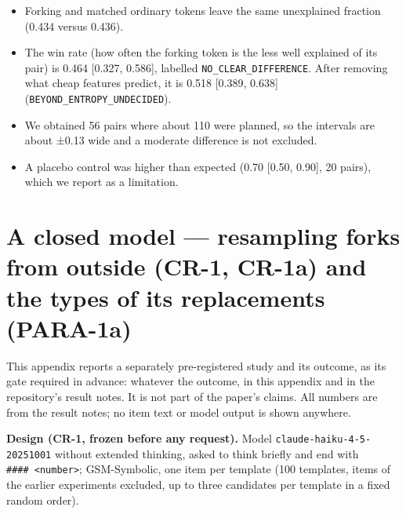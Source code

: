 \documentclass[
  10pt,
  a4paper,
]{article}
\providecommand{\tightlist}{%
  \setlength{\itemsep}{0pt}\setlength{\parskip}{0pt}}
\begin{document}
\begin{itemize}
\tightlist
\item
  Forking and matched ordinary tokens leave the same unexplained fraction (0.434 versus 0.436).
\item
  The win rate (how often the forking token is the less well explained of its pair) is 0.464 {[}0.327, 0.586{]}, labelled \texttt{NO\_\allowbreak{}CLEAR\_\allowbreak{}DIFFERENCE}. After removing what cheap features predict, it
  is 0.518 {[}0.389, 0.638{]} (\texttt{BEYOND\_\allowbreak{}ENTROPY\_\allowbreak{}UNDECIDED}).
\item
  We obtained 56 pairs where about 110 were planned, so the intervals are about ±0.13 wide and a moderate difference is not excluded.
\item
  A placebo control was higher than expected (0.70 {[}0.50, 0.90{]}, 20 pairs), which we report as a limitation.
\end{itemize}

\hypertarget{a-closed-model-resampling-forks-from-outside-cr-1-cr-1a-and-the-types-of-its-replacements-para-1a}{%
\section{A closed model --- resampling forks from outside (CR-1, CR-1a) and the types of its replacements
(PARA-1a)}\label{a-closed-model-resampling-forks-from-outside-cr-1-cr-1a-and-the-types-of-its-replacements-para-1a}}

This appendix reports a separately pre-registered study and its outcome, as its gate required in advance: whatever the outcome, in this appendix and in the repository's result notes. It is not part of
the paper's claims. All numbers are from the result notes; no item text or model output is shown anywhere.

\textbf{Design (CR-1, frozen before any request).} Model \texttt{claude-haiku-4-5-20251001} without extended thinking, asked to think briefly and end with
\texttt{\#\#\#\#\ \textless{}number\textgreater{}}; GSM-Symbolic, one item per template (100 templates, items of the earlier experiments excluded, up to three candidates per template in a fixed random
order).
\end{document}
